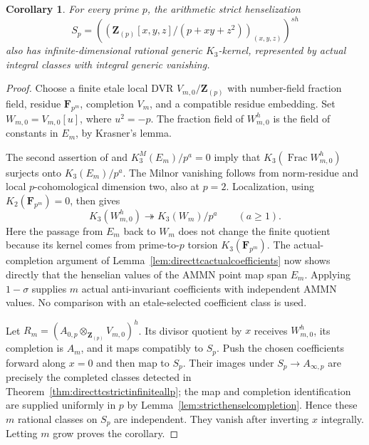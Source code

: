 \documentclass[11pt,a4paper]{article}
\newtheorem{corollary}[theorem]{Corollary}
\theoremstyle{remark}
\begin{document}
\begin{corollary}\label{cor:directtcstrictarithmeticallp}
For every prime $p$, the arithmetic strict henselization
\[
 S_p=\left(\left(\mathbf Z_{(p)}[x,y,z]/(p+xy+z^2)\right)
                         _{(x,y,z)}\right)^{sh}
\]
also has infinite-dimensional rational generic $K_3$-kernel,
represented by actual integral classes with integral generic vanishing.
\end{corollary}
\begin{proof}
Choose a finite etale local DVR $V_{m,0}/\mathbf Z_{(p)}$ with
number-field fraction field, residue $\mathbf F_{p^m}$, completion
$V_m$, and a compatible residue embedding. Set $W_{m,0}=V_{m,0}[u]$,
where $u^2=-p$. The fraction field of $W_{m,0}^h$ is the field of
constants in $E_m$, by Krasner's lemma.

The second assertion of \cite[Theorem~4.13]{LevineIndK3} and
$K_3^M(E_m)/p^a=0$ imply that
$K_3(\operatorname{Frac}W_{m,0}^h)$ surjects onto $K_3(E_m)/p^a$.
The Milnor vanishing follows from norm-residue and local
$p$-cohomological dimension two, also at $p=2$. Localization, using
$K_2(\mathbf F_{p^m})=0$, then gives
\[
 K_3(W_{m,0}^h)\twoheadrightarrow K_3(W_m)/p^a
 \qquad(a\ge1).
\]
Here the passage from $E_m$ back to $W_m$ does not change the finite
quotient because its kernel comes from prime-to-$p$ torsion
$K_3(\mathbf F_{p^m})$. The actual-completion argument of
Lemma~\ref{lem:directtcactualcoefficients} now shows directly that
the henselian values of the AMMN point map span $E_m$. Applying
$1-\sigma$ supplies $m$ actual anti-invariant coefficients with
independent AMMN values. No comparison with an etale-selected
coefficient class is used.

Let $R_m=(A_{0,p}\otimes_{\mathbf Z_{(p)}}V_{m,0})^h$.
Its divisor quotient by $x$ receives $W_{m,0}^h$, its completion is
$A_m$, and it maps compatibly to $S_p$. Push the chosen coefficients
forward along $x=0$ and then map to $S_p$. Their images under
$S_p\to A_{\infty,p}$ are precisely the completed classes detected
in Theorem~\ref{thm:directtcstrictinfiniteallp}; the map and completion
identification are supplied uniformly in $p$ by
Lemma~\ref{lem:stricthenselcompletion}. Hence these $m$ rational
classes on $S_p$ are independent. They vanish after inverting $x$
integrally. Letting $m$ grow proves the corollary.
\end{proof}

\end{document}
